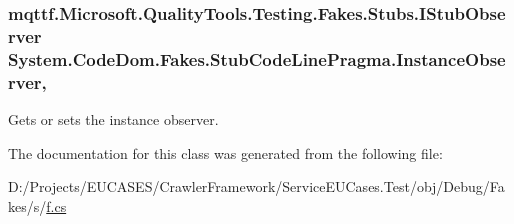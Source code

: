 \hypertarget{class_system_1_1_code_dom_1_1_fakes_1_1_stub_code_line_pragma_ae41bf6a83d6a8490c516b057dc702279}{
\subsubsection[{Instance\-Observer}]{\setlength{\rightskip}{0pt plus 5cm}mqttf.\-Microsoft.\-Quality\-Tools.\-Testing.\-Fakes.\-Stubs.\-I\-Stub\-Observer System.\-Code\-Dom.\-Fakes.\-Stub\-Code\-Line\-Pragma.\-Instance\-Observer\hspace{0.3cm}{\ttfamily [get]}, {\ttfamily [set]}}}\label{class_system_1_1_code_dom_1_1_fakes_1_1_stub_code_line_pragma_ae41bf6a83d6a8490c516b057dc702279}


Gets or sets the instance observer.



The documentation for this class was generated from the following file\-:\begin{DoxyCompactItemize}
\item 
D\-:/\-Projects/\-E\-U\-C\-A\-S\-E\-S/\-Crawler\-Framework/\-Service\-E\-U\-Cases.\-Test/obj/\-Debug/\-Fakes/s/\hyperlink{s_2f_8cs}{f.\-cs}\end{DoxyCompactItemize}
